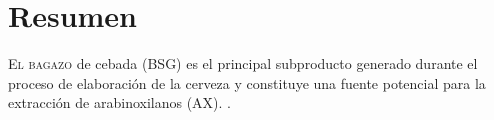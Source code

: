 \chapter*{Resumen}

\lettrine[lines=3]{E}{l bagazo} de cebada (BSG) es el principal subproducto generado durante el proceso de elaboración de la cerveza y constituye una fuente potencial para la extracción de arabinoxilanos (AX). \lipsum[6].